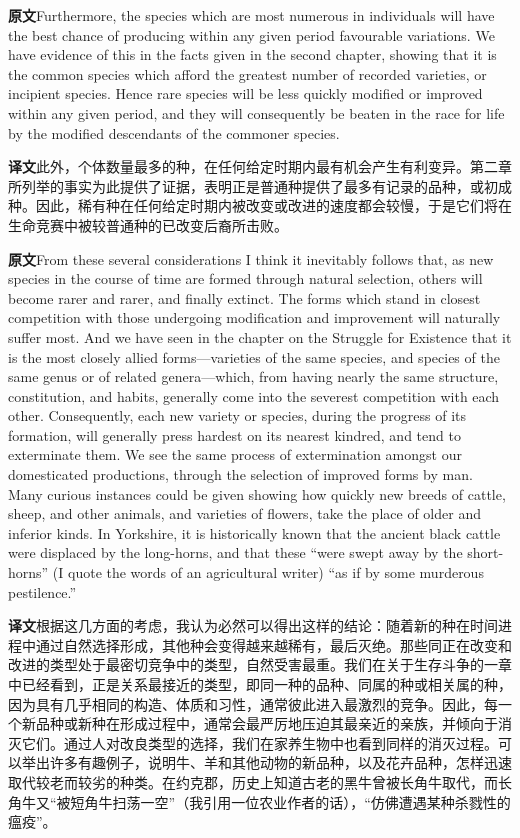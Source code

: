 \documentclass[UTF8,zihao=-4]{ctexart}
\newcommand{\BodyFont}{\fontsize{10.5pt}{15.5pt}\selectfont}
\newcommand{\origlabel}{\textbf{原文}\quad}
\newcommand{\translabel}{\textbf{译文}\quad}
\newenvironment{enblock}{\par\noindent\begingroup\BodyFont\origlabel}{\par\endgroup}
\newenvironment{zhblock}{\par\noindent\begingroup\BodyFont\translabel}{\par\endgroup\vspace{0.35em}}
\newcommand{\pair}[2]{\begin{enblock}#1\end{enblock}\begin{zhblock}#2\end{zhblock}}
\begin{document}
\pair{Furthermore, the species which are most numerous in individuals will have the best chance of producing within any given period favourable variations. We have evidence of this in the facts given in the second chapter, showing that it is the common species which afford the greatest number of recorded varieties, or incipient species. Hence rare species will be less quickly modified or improved within any given period, and they will consequently be beaten in the race for life by the modified descendants of the commoner species.}{此外，个体数量最多的种，在任何给定时期内最有机会产生有利变异。第二章所列举的事实为此提供了证据，表明正是普通种提供了最多有记录的品种，或初成种。因此，稀有种在任何给定时期内被改变或改进的速度都会较慢，于是它们将在生命竞赛中被较普通种的已改变后裔所击败。}

\pair{From these several considerations I think it inevitably follows that, as new species in the course of time are formed through natural selection, others will become rarer and rarer, and finally extinct. The forms which stand in closest competition with those undergoing modification and improvement will naturally suffer most. And we have seen in the chapter on the Struggle for Existence that it is the most closely allied forms—varieties of the same species, and species of the same genus or of related genera—which, from having nearly the same structure, constitution, and habits, generally come into the severest competition with each other. Consequently, each new variety or species, during the progress of its formation, will generally press hardest on its nearest kindred, and tend to exterminate them. We see the same process of extermination amongst our domesticated productions, through the selection of improved forms by man. Many curious instances could be given showing how quickly new breeds of cattle, sheep, and other animals, and varieties of flowers, take the place of older and inferior kinds. In Yorkshire, it is historically known that the ancient black cattle were displaced by the long-horns, and that these “were swept away by the short-horns” (I quote the words of an agricultural writer) “as if by some murderous pestilence.”}{根据这几方面的考虑，我认为必然可以得出这样的结论：随着新的种在时间进程中通过自然选择形成，其他种会变得越来越稀有，最后灭绝。那些同正在改变和改进的类型处于最密切竞争中的类型，自然受害最重。我们在关于生存斗争的一章中已经看到，正是关系最接近的类型，即同一种的品种、同属的种或相关属的种，因为具有几乎相同的构造、体质和习性，通常彼此进入最激烈的竞争。因此，每一个新品种或新种在形成过程中，通常会最严厉地压迫其最亲近的亲族，并倾向于消灭它们。通过人对改良类型的选择，我们在家养生物中也看到同样的消灭过程。可以举出许多有趣例子，说明牛、羊和其他动物的新品种，以及花卉品种，怎样迅速取代较老而较劣的种类。在约克郡，历史上知道古老的黑牛曾被长角牛取代，而长角牛又“被短角牛扫荡一空”（我引用一位农业作者的话），“仿佛遭遇某种杀戮性的瘟疫”。}
\end{document}
